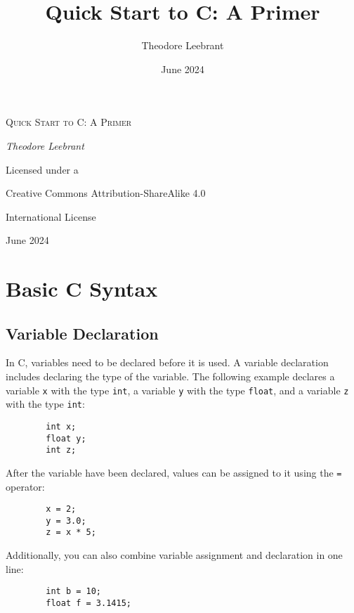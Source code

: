 \documentclass[oneside]{book}
\title{Quick Start to C: A Primer}
\author{Theodore Leebrant}
\date{June 2024}
\theoremstyle{definition}
\begin{document}
\begin{titlepage}
	\centering
	{\Huge \textsc{Quick Start to C: A Primer}\par}
	\vspace{1.5cm}
	{\large \itshape Theodore Leebrant\par}
	\vfill
	{\Large Licensed under a\par
	Creative Commons Attribution-ShareAlike 4.0\par
    International License}

	\vfill


	{\large June 2024\par}
\end{titlepage}

\tableofcontents

\setlength{\parskip}{12pt}





\pagebreak



\chapter{Basic C Syntax}
    \section{Variable Declaration}
    In C, variables need to be declared before it is used. A variable declaration includes declaring the type of the variable. The following example declares a variable \texttt{x} with the type \texttt{int}, a variable \texttt{y} with the type \texttt{float}, and a variable \texttt{z} with the type \texttt{int}:
    \begin{verbatim}
        int x;
        float y;
        int z;
    \end{verbatim}
    After the variable have been declared, values can be assigned to it using the \verb|=| operator:
    \begin{verbatim}
        x = 2;
        y = 3.0;
        z = x * 5;
    \end{verbatim}
    Additionally, you can also combine variable assignment and declaration in one line:
    \begin{verbatim}
        int b = 10;
        float f = 3.1415;
    \end{verbatim}
\end{document}

